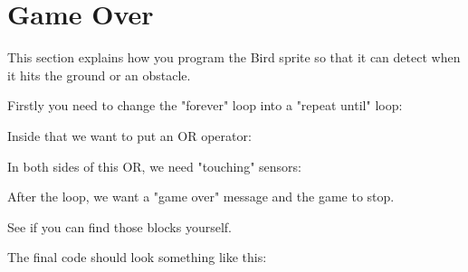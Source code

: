 \section{Game Over}
This section explains how you program the Bird sprite so that it can detect when it hits the ground or an obstacle.

Firstly you need to change the "forever" loop into a "repeat until" loop:

Inside that we want to put an OR operator:

In both sides of this OR, we need "touching" sensors:

After the loop, we want a "game over" message and the game to stop.

See if you can find those blocks yourself.

The final code should look something like this:

